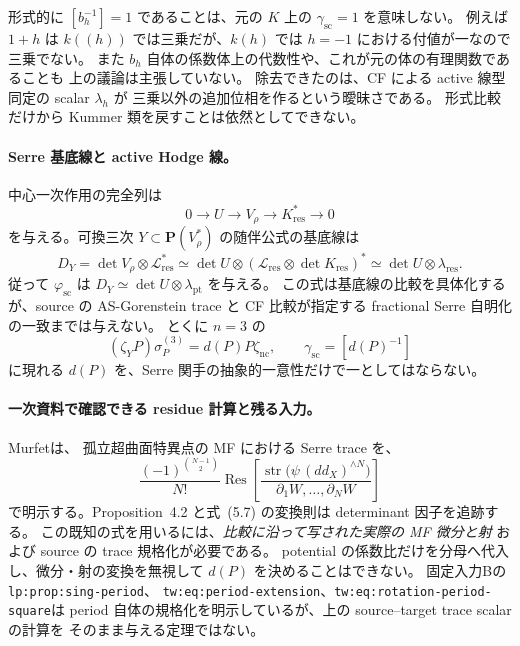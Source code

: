 \begin{remark}[ここまでの式が計算していないもの]
形式的に $[b_h^{-1}]=1$ であることは、元の $K$ 上の
$\gamma_{\mathrm{sc}}=1$ を意味しない。
例えば $1+h$ は $k((h))$ では三乗だが、$k(h)$ では
$h=-1$ における付値が一なので三乗でない。
また $b_h$ 自体の係数体上の代数性や、これが元の体の有理関数であることも
上の議論は主張していない。
除去できたのは、CF による active 線型同定の scalar $\lambda_h$ が
三乗以外の追加位相を作るという曖昧さである。
形式比較だけから Kummer 類を戻すことは依然としてできない。
\end{remark}

\paragraph{Serre 基底線と active Hodge 線。}
中心一次作用の完全列は
\[
 0\longrightarrow U\longrightarrow V_\rho
       \longrightarrow K_{\mathrm{res}}^*\longrightarrow0
\]
を与える。可換三次
$Y\subset\mathbf P(V_\rho^*)$ の随伴公式の基底線は
\[
 D_Y=\det V_\rho\otimes\mathcal L_{\mathrm{res}}^*
     \simeq\det U\otimes
           (\mathcal L_{\mathrm{res}}\otimes\det K_{\mathrm{res}})^*
     \simeq\det U\otimes\lambda_{\mathrm{res}}.
\]
従って $\varphi_{\mathrm{sc}}$ は
$D_Y\simeq\det U\otimes\lambda_{\mathrm{pt}}$ を与える。
この式は基底線の比較を具体化するが、source の AS-Gorenstein trace と
CF 比較が指定する fractional Serre 自明化の一致までは与えない。
とくに $n=3$ の
\[
 (\zeta_YP)\sigma_P^{(3)}=d(P)P\zeta_{\mathrm{nc}},
 \qquad \gamma_{\mathrm{sc}}=[d(P)^{-1}]
\]
に現れる $d(P)$ を、Serre 関手の抽象的一意性だけで一としてはならない。

\paragraph{一次資料で確認できる residue 計算と残る入力。}
Murfet\cite[Theorem~6.2, equation~(6.6)]{NFMMurfetResidue}は、
孤立超曲面特異点の MF における Serre trace を、
\[
 \frac{(-1)^{\binom{N-1}{2}}}{N!}
 \operatorname{Res}
 \left[\frac{\operatorname{str}\bigl(\psi\,(d d_X)^{\wedge N}\bigr)}
 {\partial_1W,\ldots,\partial_NW}\right]
\]
で明示する。Proposition~4.2 と式~(5.7) の変換則は determinant 因子を追跡する。
この既知の式を用いるには、\emph{比較に沿って写された実際の MF 微分と射}
および source の trace 規格化が必要である。
potential の係数比だけを分母へ代入し、微分・射の変換を無視して
$d(P)$ を決めることはできない。
固定入力Bの \texttt{lp:prop:sing-period}、
\texttt{tw:eq:period-extension}、\texttt{tw:eq:rotation-period-square}は
period 自体の規格化を明示しているが、上の source--target trace scalar の計算を
そのまま与える定理ではない。

